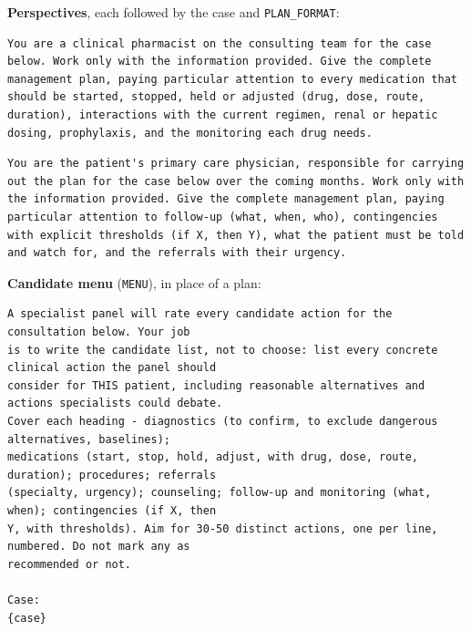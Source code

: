 \documentclass[11pt]{article}
\begin{document}
\textbf{Perspectives}, each followed by the case and \texttt{PLAN\_FORMAT}:
\begin{lstlisting}
You are a clinical pharmacist on the consulting team for the case below. Work only with the information provided. Give the complete management plan, paying particular attention to every medication that should be started, stopped, held or adjusted (drug, dose, route, duration), interactions with the current regimen, renal or hepatic dosing, prophylaxis, and the monitoring each drug needs.
\end{lstlisting}
\begin{lstlisting}
You are the patient's primary care physician, responsible for carrying out the plan for the case below over the coming months. Work only with the information provided. Give the complete management plan, paying particular attention to follow-up (what, when, who), contingencies with explicit thresholds (if X, then Y), what the patient must be told and watch for, and the referrals with their urgency.
\end{lstlisting}

\textbf{Candidate menu} (\texttt{MENU}), in place of a plan:
\begin{lstlisting}
A specialist panel will rate every candidate action for the consultation below. Your job
is to write the candidate list, not to choose: list every concrete clinical action the panel should
consider for THIS patient, including reasonable alternatives and actions specialists could debate.
Cover each heading - diagnostics (to confirm, to exclude dangerous alternatives, baselines);
medications (start, stop, hold, adjust, with drug, dose, route, duration); procedures; referrals
(specialty, urgency); counseling; follow-up and monitoring (what, when); contingencies (if X, then
Y, with thresholds). Aim for 30-50 distinct actions, one per line, numbered. Do not mark any as
recommended or not.

Case:
{case}
\end{lstlisting}
\end{document}
